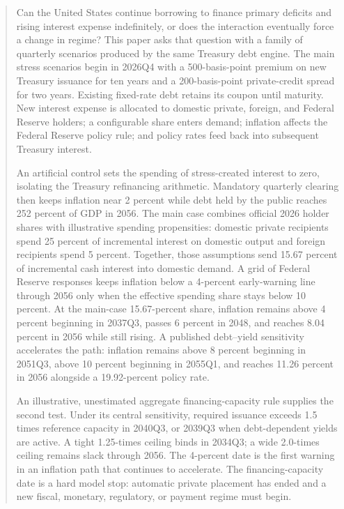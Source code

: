\documentclass[11pt]{article}
\begin{document}
\begin{abstract}
Can the United States continue borrowing to finance primary deficits and rising interest
expense indefinitely, or does the interaction eventually force a change in regime?  This
paper asks that question with a family of quarterly scenarios produced by the same Treasury
debt engine.  The main stress scenarios begin in 2026Q4 with a 500-basis-point premium on new
Treasury issuance for ten years and a 200-basis-point private-credit spread for two years.
Existing fixed-rate debt
retains its coupon until maturity.  New interest expense is allocated to domestic private,
foreign, and Federal Reserve holders; a configurable share enters demand; inflation affects
the Federal Reserve policy rule; and policy rates feed back into subsequent Treasury
interest.

An artificial control sets the spending of stress-created interest to zero, isolating the
Treasury refinancing arithmetic.  Mandatory quarterly clearing then keeps inflation near 2
percent while debt held by the public reaches 252 percent of GDP in 2056.  The main case
combines official 2026 holder shares with illustrative spending propensities: domestic private
recipients spend 25 percent of incremental interest on domestic output and foreign recipients
spend 5 percent.  Together, those assumptions send 15.67 percent of incremental cash interest
into domestic demand.  A grid of Federal Reserve responses keeps inflation below a
4-percent early-warning line through 2056 only when the effective spending share stays below
10 percent.  At the main-case 15.67-percent share, inflation remains above 4 percent beginning
in 2037Q3, passes 6 percent in 2048, and reaches 8.04 percent in 2056 while still rising.  A
published debt--yield sensitivity accelerates the path: inflation remains above 8 percent
beginning in 2051Q3, above 10 percent beginning in 2055Q1, and reaches 11.26 percent in 2056
alongside a 19.92-percent policy rate.

An illustrative, unestimated aggregate financing-capacity rule supplies the second test.  Under its central
sensitivity, required issuance exceeds 1.5 times reference capacity in 2040Q3, or 2039Q3
when debt-dependent yields are active.  A tight 1.25-times ceiling binds in 2034Q3; a wide
2.0-times ceiling remains slack through 2056.  The 4-percent date is the first warning in an
inflation path that continues to accelerate.  The financing-capacity date is a hard model
stop: automatic private placement has ended and a new fiscal, monetary, regulatory, or
payment regime must begin.


\end{abstract}
\end{document}
